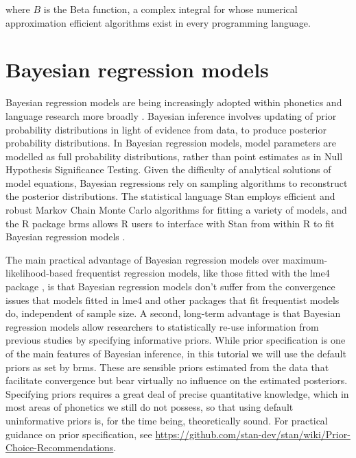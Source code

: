 \documentclass[
  authoryear,
  preprint,
  3p]{elsarticle}
\begin{document}
where \(B\) is the Beta function, a complex integral for whose numerical
approximation efficient algorithms exist in every programming language.

\section{Bayesian regression models}\label{sec-bayes}

Bayesian regression models are being increasingly adopted within
phonetics and language research more broadly
\citep{vasishth2018, nalborczyk2019, verissimo2021}. Bayesian inference
involves updating of prior probability distributions in light of
evidence from data, to produce posterior probability distributions. In
Bayesian regression models, model parameters are modelled as full
probability distributions, rather than point estimates as in Null
Hypothesis Significance Testing. Given the difficulty of analytical
solutions of model equations, Bayesian regressions rely on sampling
algorithms to reconstruct the posterior distributions. The statistical
language Stan \citep{standevelopmentteam2017} employs efficient and
robust Markov Chain Monte Carlo algorithms for fitting a variety of
models, and the R package brms allows R users to interface with Stan
from within R to fit Bayesian regression models
\citep{burkner2017, burkner2018, burkner2021}.

The main practical advantage of Bayesian regression models over
maximum-likelihood-based frequentist regression models, like those
fitted with the lme4 package \citep{bates2015}, is that Bayesian
regression models don't suffer from the convergence issues that models
fitted in lme4 \citep{bates2015} and other packages
\citep{cribarineto2010} that fit frequentist models do, independent of
sample size. A second, long-term advantage is that Bayesian regression
models allow researchers to statistically re-use information from
previous studies by specifying informative priors. While prior
specification is one of the main features of Bayesian inference, in this
tutorial we will use the default priors as set by brms. These are
sensible priors estimated from the data that facilitate convergence but
bear virtually no influence on the estimated posteriors. Specifying
priors requires a great deal of precise quantitative knowledge, which in
most areas of phonetics we still do not possess, so that using default
uninformative priors is, for the time being, theoretically sound. For
practical guidance on prior specification, see
\url{https://github.com/stan-dev/stan/wiki/Prior-Choice-Recommendations}.
\end{document}
